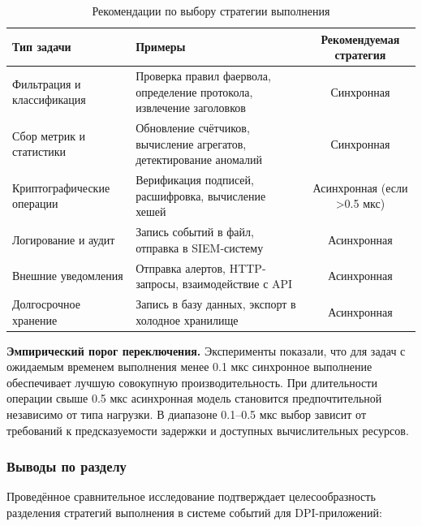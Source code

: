 \begin{table}[H]
\centering
\footnotesize
\caption{Рекомендации по выбору стратегии выполнения}
\label{tab:strategy_recommendations}
\begin{tabularx}{\textwidth}{lXc}
\toprule
\textbf{Тип задачи} & \textbf{Примеры} & \textbf{Рекомендуемая стратегия} \\
\midrule
Фильтрация и классификация & Проверка правил фаервола, определение протокола, извлечение заголовков & Синхронная \\
Сбор метрик и статистики & Обновление счётчиков, вычисление агрегатов, детектирование аномалий & Синхронная \\
Криптографические операции & Верификация подписей, расшифровка, вычисление хешей & Асинхронная (если >0.5 мкс) \\
Логирование и аудит & Запись событий в файл, отправка в SIEM-систему & Асинхронная \\
Внешние уведомления & Отправка алертов, HTTP-запросы, взаимодействие с API & Асинхронная \\
Долгосрочное хранение & Запись в базу данных, экспорт в холодное хранилище & Асинхронная \\
\bottomrule
\end{tabularx}
\end{table}

\textbf{Эмпирический порог переключения.} Эксперименты показали, что для задач с ожидаемым временем выполнения менее 0.1 мкс синхронное выполнение обеспечивает лучшую совокупную производительность.
При длительности операции свыше 0.5 мкс асинхронная модель становится предпочтительной независимо от типа нагрузки.
В диапазоне 0.1--0.5 мкс выбор зависит от требований к предсказуемости задержки и доступных вычислительных ресурсов.

\subsubsection{Выводы по разделу}

Проведённое сравнительное исследование подтверждает целесообразность разделения стратегий выполнения в системе событий для DPI-приложений:

